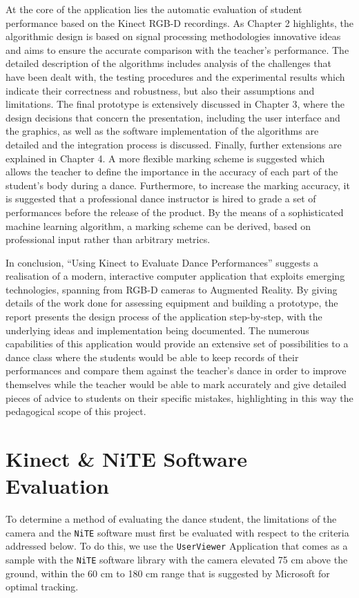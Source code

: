 \documentclass[10pt,a4paper]{article}
\begin{document}
\noindent
At the core of the application lies the automatic evaluation of student performance based on the Kinect RGB-D recordings. As Chapter 2 highlights, the algorithmic design is based on signal processing methodologies innovative ideas and aims to ensure the accurate comparison with the teacher’s performance. The detailed description of the algorithms includes analysis of the challenges that have been dealt with, the testing procedures and the experimental results which indicate their correctness and robustness, but also their assumptions and limitations. The final prototype is extensively discussed in Chapter 3, where the design decisions that concern the presentation, including the user interface and the graphics, as well as the software implementation of the algorithms are detailed and the integration process is discussed. Finally, further extensions are explained in Chapter 4. A more flexible marking scheme is suggested which allows the teacher to define the importance in the accuracy of each part of the student’s body during a dance. Furthermore, to increase the marking accuracy, it is suggested that a professional dance instructor is hired to grade a set of performances before the release of the product. By the means of a sophisticated machine learning algorithm, a marking scheme can be derived, based on professional input rather than arbitrary metrics.

\noindent
In conclusion, “Using Kinect to Evaluate Dance Performances” suggests a realisation of a modern, interactive computer application that exploits emerging technologies, spanning from RGB-D cameras to Augmented Reality. By giving details of the work done for assessing equipment and building a prototype, the report presents the design process of the application step-by-step, with the underlying ideas and implementation being documented. The numerous capabilities of this application would provide an extensive set of possibilities to a dance class where the students would be able to keep records of their performances and compare them against the teacher’s dance in order to improve themselves while the teacher would be able to mark accurately and give detailed pieces of advice to students on their specific mistakes, highlighting in this way the pedagogical scope of this project.

\clearpage

\setcounter{page}{1}
\section{Kinect \& NiTE Software Evaluation}
\noindent
To determine a method of evaluating the dance student, the limitations of the camera and the \texttt{NiTE} software must first be evaluated with respect to the criteria addressed below. To do this, we use the \texttt{UserViewer} Application that comes as a sample with the \texttt{NiTE} software library with the camera elevated 75 cm above the ground, within the 60 cm to 180 cm range that is suggested by Microsoft for optimal tracking. 
\end{document}
